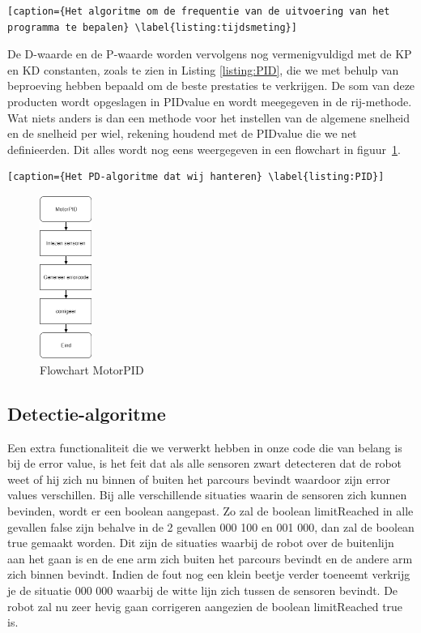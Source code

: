 
\begin{lstlisting}[caption={Het algoritme om de frequentie van de uitvoering van het programma te bepalen} \label{listing:tijdsmeting}]
\end{lstlisting}

De D-waarde en de P-waarde worden vervolgens nog vermenigvuldigd met de KP en KD constanten, zoals te zien in Listing \ref{listing:PID},  die we met behulp van beproeving hebben bepaald om de beste prestaties te verkrijgen. De som van deze producten wordt opgeslagen in PIDvalue en wordt meegegeven in de rij-methode. Wat niets anders is dan een methode voor het instellen van de algemene snelheid en de snelheid per wiel, rekening houdend met de PIDvalue die we net definieerden. Dit alles wordt nog eens weergegeven in een flowchart in figuur~\ref{fig:flowchartMotor}.


\begin{lstlisting}[caption={Het PD-algoritme dat wij hanteren} \label{listing:PID}]
\end{lstlisting}

\begin{figure}[h]
\centering
\includegraphics[width=0.15\textwidth]{MotorPIDFlowchart.png}
\caption{Flowchart MotorPID}
\label{fig:flowchartMotor}
\end{figure}


\subsection{Detectie-algoritme}

Een extra functionaliteit die we verwerkt hebben in onze code die van belang is bij de error value, is het feit dat als alle sensoren zwart detecteren dat de robot weet of hij zich nu binnen of buiten het parcours bevindt waardoor zijn error values verschillen. Bij alle verschillende situaties waarin de sensoren zich kunnen bevinden, wordt er een boolean aangepast. Zo zal de boolean limitReached in alle gevallen false zijn behalve in de 2 gevallen 000 100 en 001 000, dan zal de boolean true gemaakt worden. Dit zijn de situaties waarbij de robot over de buitenlijn aan het gaan is en de ene arm zich buiten het parcours bevindt en de andere arm zich binnen bevindt. Indien de fout nog een klein beetje verder toeneemt verkrijg je de situatie 000 000 waarbij de witte lijn zich tussen de sensoren bevindt. De robot zal nu zeer hevig gaan corrigeren aangezien de boolean limitReached true is. 

